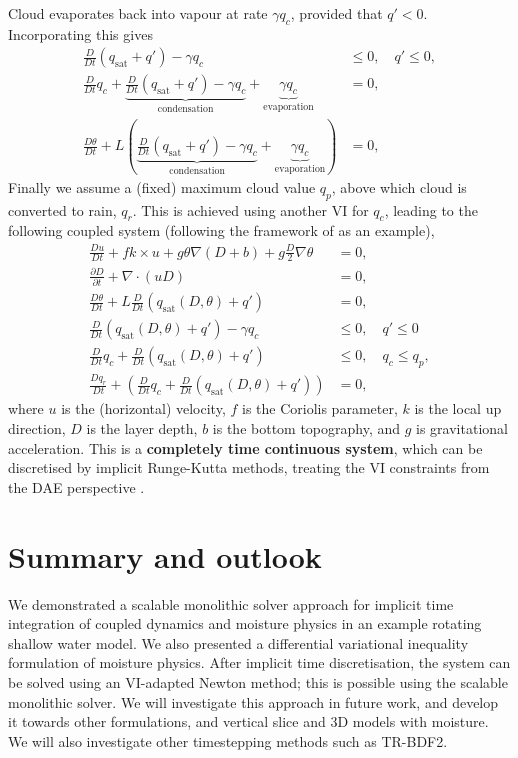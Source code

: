 \documentclass[
]{ImperialPoster}
\DeclareMathOperator{\sat}{sat}
\newcommand{\pp}[2]{\frac{\partial #1}{\partial #2}}
\newcommand{\DD}[2]{\frac{D #1}{D #2}}
\begin{document}
\begin{multicols}{3}
Cloud evaporates back into vapour at rate $\gamma q_c$, provided that
$q'<0$. Incorporating this gives
\begin{align*}
  \DD{}{t}(q_{\sat}+q') - \gamma q_c & \leq 0, \quad
  q' \leq 0, \\
  \DD{}{t}q_c + \underbrace{\DD{}{t}(q_{\sat}+q') - \gamma q_c}_{\mbox{condensation}} + \underbrace{\gamma q_c}_{\mbox{evaporation}} & = 0, \\
  \DD{\theta}{t} + L\left(
  \underbrace{\DD{}{t}(q_{\sat}+q') - \gamma q_c}_{\mbox{condensation}} + \underbrace{\gamma q_c}_{\mbox{evaporation}}\right) & = 0, 
\end{align*}
Finally we assume a (fixed) maximum cloud value $q_p$, above which
cloud is converted to rain, $q_r$. This is achieved using another VI
for $q_c$, leading to the following
coupled system (following the framework of \cite{zerroukat2015moist} as an example),
\begin{align*}
  \DD{u}{t} + fk\times u + g\theta \nabla (D+b) + g\frac{D}{2}\nabla \theta
  & = 0, \\
  \pp{D}{t} + \nabla\cdot(uD) & = 0, \\
  \DD{\theta}{t} + L\DD{}{t}(q_{\sat}(D,\theta)+q') & = 0, \\
  \DD{}{t}(q_{\sat}(D,\theta)+q') - \gamma q_c & \leq 0, \quad q'\leq 0 \\
  \DD{}{t}q_c + \DD{}{t}(q_{\sat}(D,\theta)+q') & \leq 0, \quad
  q_c \leq q_p, \\
  \DD{q_r}{t} + \left(\DD{}{t}q_c + \DD{}{t}(q_{\sat}(D,\theta)+q')\right) & = 0,
\end{align*}
where $u$ is the (horizontal) velocity, $f$ is the Coriolis parameter,
$k$ is the local up direction, $D$ is the layer depth, $b$ is the
bottom topography, and $g$ is gravitational acceleration. This is a
{\bfseries completely time continuous system}, which can be discretised by
implicit Runge-Kutta methods, treating
the VI constraints from the DAE perspective \cite{kirby2024extending}.

\section{Summary and outlook}

We demonstrated a scalable monolithic solver approach for implicit
time integration of coupled dynamics and moisture physics in an
example rotating shallow water model.  We also presented a
differential variational inequality formulation of moisture
physics. After implicit time discretisation, the system can be solved
using an VI-adapted Newton method; this is possible using the scalable
monolithic solver. We will investigate this approach in future work,
and develop it towards other formulations, and vertical slice and 3D
models with moisture. We will also investigate other timestepping methods
such as TR-BDF2.


\end{multicols}
\end{document}
